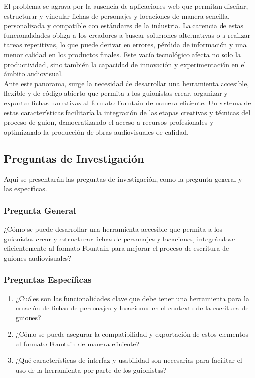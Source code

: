 \documentclass[12pt]{article}
\begin{document}
	El problema se agrava por la ausencia de aplicaciones web que permitan diseñar, estructurar y vincular fichas de personajes y locaciones de manera sencilla, personalizada y compatible con estándares de la industria. La carencia de estas funcionalidades obliga a los creadores a buscar soluciones alternativas o a realizar tareas repetitivas, lo que puede derivar en errores, pérdida de información y una menor calidad en los productos finales. Este vacío tecnológico afecta no solo la productividad, sino también la capacidad de innovación y experimentación en el ámbito audiovisual. \\

	Ante este panorama, surge la necesidad de desarrollar una herramienta accesible, flexible y de código abierto que permita a los guionistas crear, organizar y exportar fichas narrativas al formato Fountain de manera eficiente. Un sistema de estas características facilitaría la integración de las etapas creativas y técnicas del proceso de guion, democratizando el acceso a recursos profesionales y optimizando la producción de obras audiovisuales de calidad. \\

	\newpage

	\subsection{Preguntas de Investigación}

	Aquí se presentarán las preguntas de investigación, como la pregunta general y las específicas.

	\subsubsection{Pregunta General}
	¿Cómo se puede desarrollar una herramienta accesible que permita a los guionistas crear y estructurar fichas de personajes y locaciones, integrándose eficientemente al formato Fountain para mejorar el proceso de escritura de guiones audiovisuales?

	\subsubsection{Preguntas Específicas}
	\begin{enumerate}
		\item ¿Cuáles son las funcionalidades clave que debe tener una herramienta para la creación de fichas de personajes y locaciones en el contexto de la escritura de guiones?
		\item ¿Cómo se puede asegurar la compatibilidad y exportación de estos elementos al formato Fountain de manera eficiente?
		\item ¿Qué características de interfaz y usabilidad son necesarias para facilitar el uso de la herramienta por parte de los guionistas?
	\end{enumerate}
\end{document}
